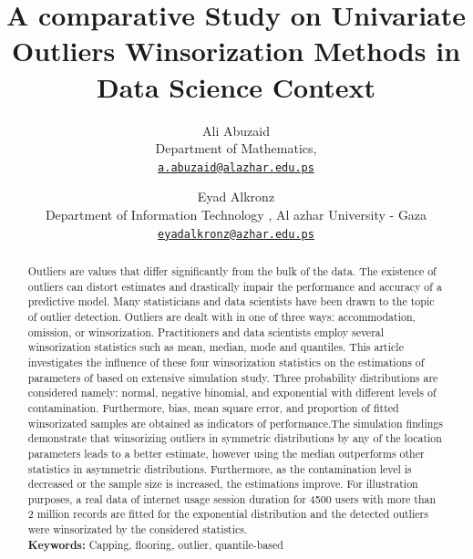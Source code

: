 \documentclass[notitlepage,12pt]{jedm}
\begin{document}
\title{A comparative Study on Univariate Outliers Winsorization Methods
in Data Science Context}
\date{} %

\author{{\large Ali Abuzaid}\\Department of
Mathematics,\\\href{mailto:a.abuzaid@alazhar.edu.ps}{\nolinkurl{a.abuzaid@alazhar.edu.ps}} \and {\large Eyad
Alkronz}\\Department of Information Technology , Al azhar University -
Gaza\\\href{mailto:eyadalkronz@azhar.edu.ps}{\nolinkurl{eyadalkronz@azhar.edu.ps}}}

\maketitle

\begin{abstract}
Outliers are values that differ significantly from the bulk of the data.
The existence of outliers can distort estimates and drastically impair
the performance and accuracy of a predictive model. Many statisticians
and data scientists have been drawn to the topic of outlier detection.
Outliers are dealt with in one of three ways: accommodation, omission,
or winsorization. Practitioners and data scientists employ several
winsorization statistics such as mean, median, mode and quantiles. This
article investigates the influence of these four winsorization
statistics on the estimations of parameters of based on extensive
simulation study. Three probability distributions are considered namely:
normal, negative binomial, and exponential with different levels of
contamination. Furthermore, bias, mean square error, and proportion of
fitted winsorizated samples are obtained as indicators of
performance.The simulation findings demonstrate that winsorizing
outliers in symmetric distributions by any of the location parameters
leads to a better estimate, however using the median outperforms other
statistics in asymmetric distributions. Furthermore, as the
contamination level is decreased or the sample size is increased, the
estimations improve. For illustration purposes, a real data of internet
usage session duration for 4500 users with more than 2 million records
are fitted for the exponential distribution and the detected outliers
were winsorizated by the considered
statistics.\\ %

{\parindent0pt
\textbf{Keywords:} Capping, flooring, outlier, quantile-based
}
\end{abstract}
\end{document}
